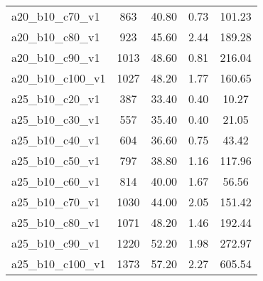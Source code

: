 \documentclass[a4paper]{article}
\begin{document}
\begin{table}[h!]
\begin{tabular}{@{} l c S[table-format=2.2] S[table-format=1.2] S[table-format=1.2] @{}}
        a20\_b10\_c70\_v1 & 863  & 40.80 & 0.73 & 101.23 \\ 
        a20\_b10\_c80\_v1 & 923  & 45.60 & 2.44 & 189.28 \\ 
        a20\_b10\_c90\_v1 & 1013  & 48.60 & 0.81 & 216.04 \\ 
        a20\_b10\_c100\_v1 & 1027  & 48.20 & 1.77 & 160.65 \\ 
        a25\_b10\_c20\_v1 & 387  & 33.40 & 0.40 & 10.27 \\ 
        a25\_b10\_c30\_v1 & 557  & 35.40 & 0.40 & 21.05 \\ 
        a25\_b10\_c40\_v1 & 604  & 36.60 & 0.75 & 43.42 \\ 
        a25\_b10\_c50\_v1 & 797  & 38.80 & 1.16 & 117.96 \\ 
        a25\_b10\_c60\_v1 & 814  & 40.00 & 1.67 & 56.56 \\ 
        a25\_b10\_c70\_v1 & 1030  & 44.00 & 2.05 & 151.42 \\ 
        a25\_b10\_c80\_v1 & 1071  & 48.20 & 1.46 & 192.44 \\ 
        a25\_b10\_c90\_v1 & 1220  & 52.20 & 1.98 & 272.97 \\ 
        a25\_b10\_c100\_v1 & 1373  & 57.20 & 2.27 & 605.54 \\ 
        \bottomrule
    \end{tabular}
\end{table}
\end{document}
